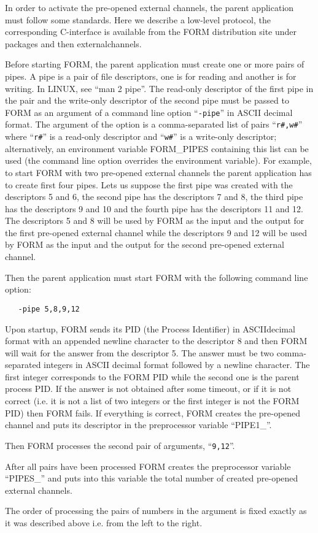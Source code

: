 In order to activate the pre-opened external channels, the parent
application must follow some standards. Here we describe a low-level 
protocol, the corresponding 
C-interface is available from the FORM distribution site 
under packages and then externalchannels.

Before starting FORM, the parent application must create one or more pairs 
of pipes. A pipe is a pair of file descriptors, one is for 
reading and another is for writing. In LINUX, see ``man 2 
pipe''. The read-only descriptor of the first pipe in the pair and the 
write-only descriptor of the second pipe must be passed to FORM as an 
argument of a command line option ``\verb|-pipe|'' in ASCII decimal format. 
The argument of the option is a comma-separated list of pairs
``\verb|r#,w#|'' where ``\verb|r#|'' is a read-only descriptor and 
``\verb|w#|'' is a write-only descriptor; alternatively, an environment 
variable FORM\_PIPES containing this list can be used 
(the command line option overrides the environment variable). For example, 
to start FORM with two pre-opened external channels the parent application 
has to create first four pipes. Lets us suppose the first pipe was created 
with the descriptors 5 and 6, the second pipe has the descriptors 7 and 8, 
the third pipe has the descriptors 9 and 10 and the fourth pipe has the 
descriptors 11 and 12. The descriptors 5 and 8 will be used by FORM as the 
input and the output for the first pre-opened external channel while the 
descriptors 9 and 12 will be used by FORM as the input and the output for 
the second pre-opened external channel.

Then the parent application must start FORM with the following 
command line option:
\begin{verbatim}
   -pipe 5,8,9,12
\end{verbatim}

Upon startup, FORM sends its PID (the Process Identifier) in 
ASCIIdecimal format with an appended newline character to the descriptor 8 
and then FORM will wait for the answer from the descriptor 5. The answer 
must be two comma-separated integers in ASCII decimal format followed by a 
newline character. The first integer corresponds to the FORM PID while the 
second one is the parent process PID. If the answer is not obtained after 
some timeout, or if it is not correct (i.e. it is not a list of two 
integers or the first integer is not the FORM PID) then FORM fails. If 
everything is correct, FORM creates the pre-opened channel and puts its 
descriptor in the preprocessor variable ``PIPE1\_''.

Then FORM processes the second pair of arguments, ``\verb|9,12|''.

After all pairs have been processed FORM creates the preprocessor variable 
``PIPES\_'' and puts into this variable the total number of created 
pre-opened external channels.

The order of processing the pairs of numbers in the argument is fixed 
exactly as it was described above i.e. from the left to the right.


